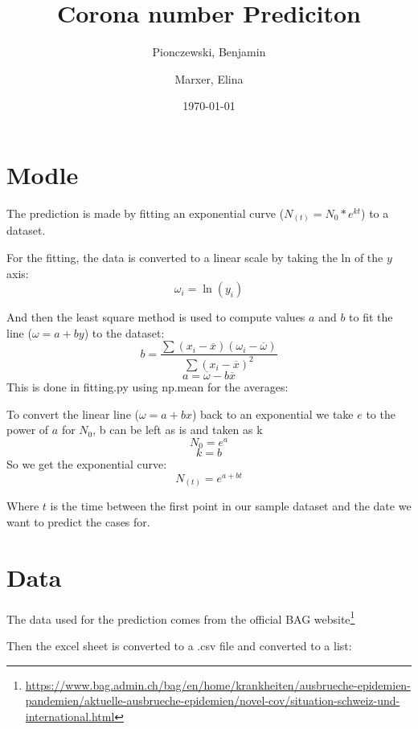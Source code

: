 \documentclass {article}
\title {Corona number Prediciton}
\author {Pionczewski, Benjamin \and Marxer, Elina}
\date {\today {}}
\begin{document}
\maketitle
\vspace {3cm}

\tableofcontents

\clearpage

\section {Modle}

The prediction is made by fitting an exponential curve ($N_{(t)} = N_0*e^{kt}$) to a dataset.

For the fitting, the data is converted to a linear scale by taking the ln of the $y$ axis:
\[\omega_i = \ln(y_i)\]



And then the least square method is used to compute values $a$ and $b$ to fit the line ($\omega = a + by$) to the dataset:
\[ b = \frac {\sum(x_i -\overline{x})(\omega_i - \overline {\omega}) } {\sum(x_i - \overline{x})^2} \]
\[ a = \overline {\omega} - b\overline{x} \]
This is done in fitting.py using np.mean for the averages:


\newpage

To convert the linear line ($\omega = a + bx$) back to an exponential we take $e$ to the power of $a$ for $N_0$, b can be left as is and taken as k
\[N_0 = e^a \]
\[k = b\]
So we get the exponential curve:
\[ N_{(t)} = e^{a + bt} \]



Where $t$ is the time between the first point in our sample dataset and the date we want to predict the cases for.

\section {Data}
The data used for the prediction comes from the official BAG website\footnote{\url{https://www.bag.admin.ch/bag/en/home/krankheiten/ausbrueche-epidemien-pandemien/aktuelle-ausbrueche-epidemien/novel-cov/situation-schweiz-und-international.html}}

Then the excel sheet is converted to a .csv file and converted to a list:

\end{document}
